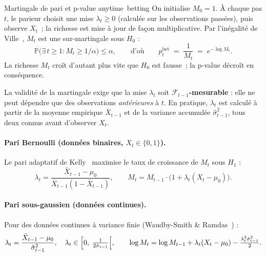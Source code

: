 \documentclass[10.5pt,a4paper]{article}
\newcommand{\Prob}{\mathbb{P}}
\begin{document}
\begin{definition}{Martingale de pari et p-value anytime~\cite{waudbysmith2021}}{betting}
On initialise $M_0 = 1$. \`A chaque pas $t$, le parieur choisit une
mise $\lambda_t \geq 0$ (calcul\'ee sur les observations pass\'ees), puis
observe $X_t$~; la richesse est mise \`a jour de fa\c{c}on multiplicative.
Par l'in\'egalit\'e de Ville~\cite{ville1939}, $M_t$ est une
sur-martingale sous $H_0$ :
\[
  \Prob\!\bigl(\exists\, t \geq 1 : M_t \geq 1/\alpha\bigr) \leq \alpha,
  \qquad \text{d'o\`u} \qquad
  p_t^{\mathrm{bet}} \;=\; \frac{1}{M_t} \;=\; e^{-\log M_t}.
\]
La richesse $M_t$ cro\^it d'autant plus vite que $H_0$ est fausse~;
la p-value d\'ecro\^it en cons\'equence.
\end{definition}

\begin{warningbox}
La validit\'e de la martingale exige que la mise $\lambda_t$ soit
\textbf{$\mathcal{F}_{t-1}$-mesurable} : elle ne peut d\'ependre que des
observations \emph{ant\'erieures} \`a $t$. En pratique, $\lambda_t$ est
calcul\'e \`a partir de la moyenne empirique $\bar{X}_{t-1}$ et de la
variance accumul\'ee $\hat{\sigma}_{t-1}^2$, tous deux connus avant
d'observer $X_t$.
\end{warningbox}

\paragraph{Pari Bernoulli (donn\'ees binaires, $X_t \in \{0,1\}$).}
Le pari adaptatif de Kelly~\cite{waudbysmith2021} maximise le taux de
croissance de $M_t$ sous $H_1$ :
\[
  \lambda_t = \frac{\bar{X}_{t-1} - \mu_0}{\bar{X}_{t-1}(1-\bar{X}_{t-1})},
  \qquad
  M_t = M_{t-1}\cdot\bigl(1 + \lambda_t (X_t - \mu_0)\bigr).
\]
\paragraph{Pari sous-gaussien (donn\'ees continues).}
Pour des donn\'ees continues \`a variance finie (Waudby-Smith \& Ramdas~\cite{waudbysmith2021}) :
\[
  \lambda_t = \frac{\bar{X}_{t-1} - \mu_0}{\hat{\sigma}_{t-1}^2},
  \quad
  \lambda_t \in \Bigl[0,\;\tfrac{1}{2\hat{\sigma}_{t-1}}\Bigl[,
  \qquad
  \log M_t = \log M_{t-1}
  + \lambda_t(X_t - \mu_0) - \tfrac{\lambda_t^2 \hat{\sigma}_{t-1}^2}{2}.
\]

\bigskip
\end{document}

